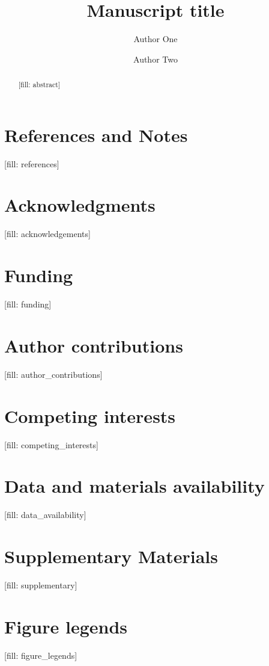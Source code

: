 \documentclass[12pt]{article}
\begin{document}
\title{Manuscript title}%
\author{Author One \and Author Two}%
\date{}
\maketitle

\begin{abstract}
[fill: abstract]
\end{abstract}

\section*{References and Notes}
[fill: references]

\section*{Acknowledgments}
[fill: acknowledgements]

\section*{Funding}
[fill: funding]

\section*{Author contributions}
[fill: author_contributions]

\section*{Competing interests}
[fill: competing_interests]

\section*{Data and materials availability}
[fill: data_availability]

\section*{Supplementary Materials}
[fill: supplementary]

\section*{Figure legends}
[fill: figure_legends]
\end{document}
